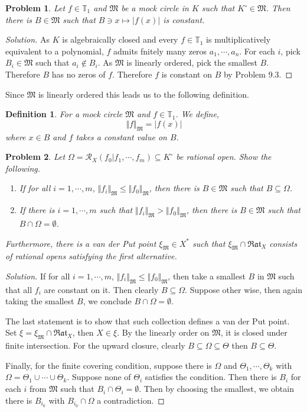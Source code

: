 \documentclass[8pt]{article}
\numberwithin{equation}{section}
\newenvironment{solution}{\begin{proof}[Solution]}{\end{proof}}
\newtheorem{definition}{Definition}[section]
\newtheorem{problem}{Problem}[section]
\newcommand{\norm}[1]{\Vert #1 \Vert}
\newcommand{\T}[0]{\mathbb{T}}
\newcommand{\cR}[0]{\mathcal{R}}
\newcommand{\ab}[1]{\vert #1 \vert}
\newcommand{\Rat}[0]{\mathfrak{Rat}}
\begin{document}
\begin{problem}
  Let $f\in \T_1$ and $\mathfrak{M}$ be a mock circle in $K$ such that $K^\circ\in\mathfrak{M}$. Then there is $B\in\mathfrak{M}$ such that $B\ni x\mapsto\ab{f(x)}$ is constant.
\end{problem}
\begin{solution}
  As $K$ is algebraically closed and every $f\in \T_1$ is multiplicatively equivalent to a polynomial, $f$ admits fnitely many zeros $a_1,\cdots,a_n$. For each $i$, pick $B_i\in\mathfrak{M}$ such that $a_i\not\in B_i$. As $\mathfrak{M}$ is linearly ordered, pick the smallest $B$. Therefore $B$ has no zeros of $f$. 
  Therefore $f$ is constant on $B$ by Problem 9.3.
\end{solution}
Since $\mathfrak{M}$ is linearly ordered this leads us to the following definition.
\begin{definition}
  For a mock circle $\mathfrak{M}$ and $f\in \T_1$. We define,
  \begin{equation*}
    \norm{f}_\mathfrak{M} = \ab{f(x)}
  \end{equation*}
  where $x\in B$ and $f$ takes a constant value on $B$.
\end{definition}
\begin{problem}
  Let $\Omega = \cR_{X}(f_0|f_1,\cdots,f_m)\subseteq K^\circ$ be rational open. Show the following.
  \begin{enumerate}
    \item If for all $i=1,\cdots,m$, $\norm{f_i}_\mathfrak{M}\leq \norm{f_0}_\mathfrak{M}$, then there is $B\in\mathfrak{M}$ such that $B\subseteq\Omega$.
    \item If there is $i=1,\cdots,m$ such that $\norm{f_i}_\mathfrak{M}>\norm{f_0}_\mathfrak{M}$, then there is $B\in\mathfrak{M}$ such that $B\cap\Omega=\emptyset$.
  \end{enumerate}
  Furthermore, there is a van der Put point $\xi_\mathfrak{M}\in X^*$ such that $\xi_\mathfrak{M}\cap\Rat_X$ consists of rational opens satisfying the first alternative.
\end{problem}
\begin{solution}
  If for all $i=1,\cdots,m$, $\norm{f_i}_\mathfrak{M}\leq \norm{f_0}_\mathfrak{M}$, then take a smallest $B$ in $\mathfrak{M}$ such that all $f_i$ are constant on it. Then clearly $B\subseteq\Omega$. Suppose other wise, then again taking the smallest $B$, we conclude $B\cap\Omega=\emptyset$.
  \par The last statement is to show that such collection defines a van der Put point. Set $\xi = \xi_\mathfrak{M}\cap\Rat_X$, then $X\in \xi$. By the linearly order on $\mathfrak{M}$, it is closed under finite intersection. For the upward closure, clearly $B\subseteq\Omega\subseteq\Theta$ then $B\subseteq\Theta$.
  \par Finally, for the finite covering condition, suppose there is $\Omega$ and $\Theta_1,\cdots,\Theta_k$ with $\Omega = \Theta_1\cup\cdots\cup\Theta_k$.
  Suppose none of $\Theta_i$ satisfies the condition. Then there is $B_i$ for each $i$ from $\mathfrak{M}$ such that $B_i\cap \Theta_i=\emptyset$. Then by choosing the smallest, we obtain there is $B_{i_0}$ with $B_{i_0}\cap \Omega$ a contradiction.
\end{solution}
\end{document}
